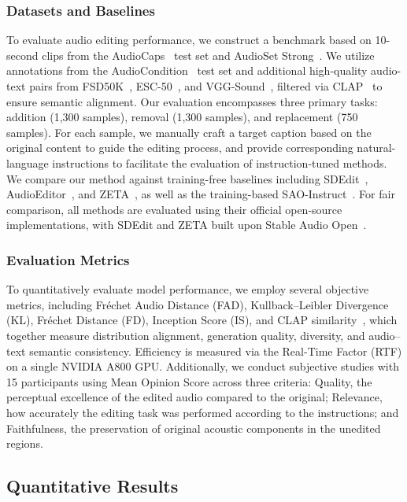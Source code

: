 \subsubsection{Datasets and Baselines}
To evaluate audio editing performance, we construct a benchmark based on 10-second clips from the AudioCaps~\cite{kim2019audiocaps} test set and AudioSet Strong~\cite{hershey2021benefit}. We utilize annotations from the AudioCondition~\cite{guo2024audio} test set and additional high-quality audio-text pairs from FSD50K~\cite{fonseca2021fsd50k}, ESC-50~\cite{piczak2015esc}, and VGG-Sound~\cite{chen2020vggsound}, filtered via CLAP~\cite{wu2023large} to ensure semantic alignment. Our evaluation encompasses three primary tasks: addition (1,300 samples), removal (1,300 samples), and replacement (750 samples). For each sample, we manually craft a target caption based on the original content to guide the editing process, and provide corresponding natural-language instructions to facilitate the evaluation of instruction-tuned methods. We compare our method against training-free baselines including SDEdit~\cite{meng2021sdedit}, AudioEditor~\cite{jia2025audioeditor}, and ZETA~\cite{manor2024zero}, as well as the training-based SAO-Instruct~\cite{ungersbock2025sao}. For fair comparison, all methods are evaluated using their official open-source implementations, with SDEdit and ZETA built upon Stable Audio Open~\cite{evans2025stable}.

\subsubsection{Evaluation Metrics}

To quantitatively evaluate model performance, we employ several objective metrics, including Fréchet Audio Distance (FAD), Kullback–Leibler Divergence (KL), Fréchet Distance (FD), Inception Score (IS), and CLAP similarity~\cite{liu2023audioldm,wu2023large}, which together measure distribution alignment, generation quality, diversity, and audio–text semantic consistency. 
Efficiency is measured via the Real-Time Factor (RTF) on a single NVIDIA A800 GPU.
Additionally, we conduct subjective studies with 15 participants using Mean Opinion Score across three criteria: Quality, the perceptual excellence of the edited audio compared to the original; Relevance, how accurately the editing task was performed according to the instructions; and Faithfulness, the preservation of original acoustic components in the unedited regions.

\subsection{Quantitative Results}

